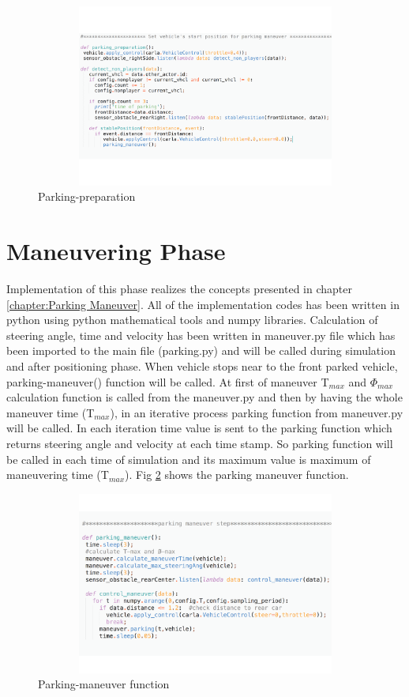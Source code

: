 \begin{figure}
\centering
    \includegraphics[width=12cm, height=6cm]{images/positioning.pdf}
    \caption{Parking-preparation}
    \label{fig:position}
\end{figure}

\section{Maneuvering Phase}
Implementation of this phase realizes the concepts presented in chapter \ref{chapter:Parking Maneuver}. All of the implementation codes has been written in python using python mathematical tools and numpy libraries. Calculation of steering angle, time and velocity has been written in maneuver.py file which has been imported to the main file (parking.py) and will be called during simulation and after positioning phase. When vehicle stops near to the front parked vehicle, parking-maneuver() function will be called. At first of maneuver T$_{max}$ and $\Phi_{max}$ calculation function is called from the maneuver.py and then by having the whole maneuver time (T$_{max}$), in an iterative process parking function from maneuver.py will be called. In each iteration time value is sent to the parking function which returns steering angle and velocity at each time stamp. So parking function will be called in each time of simulation and its maximum value is maximum of maneuvering time (T$_{max}$). Fig \ref{fig:maneuverCodes} shows the parking maneuver function.
\begin{figure}
\centering
    \includegraphics[width=12cm, height=6cm]{images/parkingManeuver.pdf}
    \caption{Parking-maneuver function}
    \label{fig:maneuverCodes}
\end{figure}



